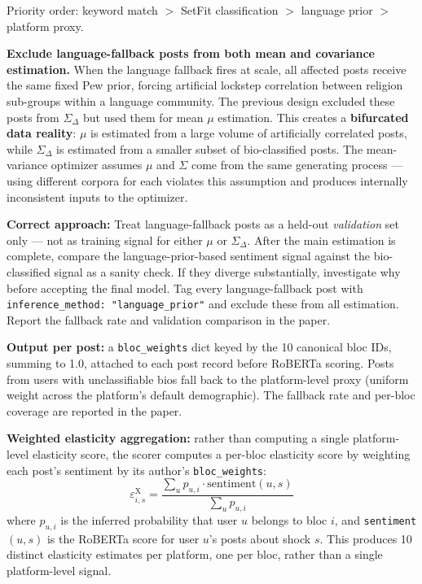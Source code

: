 \documentclass[11pt]{article}
\begin{document}
\begin{enumerate}[leftmargin=2em, itemsep=3pt]
        Priority order: keyword match $>$ SetFit classification $>$ language prior
        $>$ platform proxy.

        \begin{mdframed}[style=warnbox]
        \textbf{Exclude language-fallback posts from both mean and covariance estimation.}
        When the language fallback fires at scale, all affected posts receive the
        same fixed Pew prior, forcing artificial lockstep correlation between
        religion sub-groups within a language community. The previous design excluded
        these posts from $\Sigma_\Delta$ but used them for mean $\mu$ estimation.
        This creates a \textbf{bifurcated data reality}: $\mu$ is estimated from a
        large volume of artificially correlated posts, while $\Sigma_\Delta$ is
        estimated from a smaller subset of bio-classified posts. The mean-variance
        optimizer assumes $\mu$ and $\Sigma$ come from the same generating process
        --- using different corpora for each violates this assumption and produces
        internally inconsistent inputs to the optimizer.

        \textbf{Correct approach:} Treat language-fallback posts as a held-out
        \emph{validation} set only --- not as training signal for either $\mu$ or
        $\Sigma_\Delta$. After the main estimation is complete, compare the
        language-prior-based sentiment signal against the bio-classified signal as
        a sanity check. If they diverge substantially, investigate why before
        accepting the final model. Tag every language-fallback post with
        \texttt{inference\_method: "language\_prior"} and exclude these from all
        estimation. Report the fallback rate and validation comparison in the paper.
        \end{mdframed}
\end{enumerate}

\textbf{Output per post:} a \texttt{bloc\_weights} dict keyed by the 10 canonical
bloc IDs, summing to 1.0, attached to each post record before RoBERTa scoring.
Posts from users with unclassifiable bios fall back to the platform-level proxy
(uniform weight across the platform's default demographic). The fallback rate and
per-bloc coverage are reported in the paper.

\textbf{Weighted elasticity aggregation:} rather than computing a single
platform-level elasticity score, the scorer computes a per-bloc elasticity score
by weighting each post's sentiment by its author's \texttt{bloc\_weights}:
\[
  \varepsilon^{\mathrm{X}}_{i,s}
  = \frac{\sum_u p_{u,i} \cdot \mathrm{sentiment}(u,s)}
         {\sum_u p_{u,i}}
\]
where $p_{u,i}$ is the inferred probability that user $u$ belongs to bloc $i$,
and \texttt{sentiment}$(u,s)$ is the RoBERTa score for user $u$'s posts about
shock $s$. This produces 10 distinct elasticity estimates per platform, one per
bloc, rather than a single platform-level signal.
\end{document}
